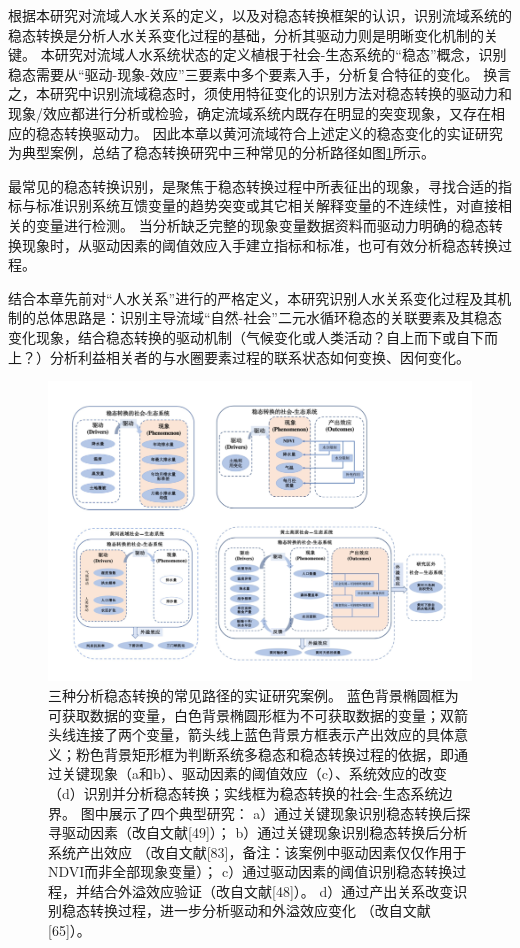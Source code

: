 根据本研究对流域人水关系的定义，以及对稳态转换框架的认识，识别流域系统的稳态转换是分析人水关系变化过程的基础，分析其驱动力则是明晰变化机制的关键。
本研究对流域人水系统状态的定义植根于社会-生态系统的“稳态”概念，识别稳态需要从“驱动-现象-效应”三要素中多个要素入手，分析复合特征的变化。
换言之，本研究中识别流域稳态时，须使用特征变化的识别方法对稳态转换的驱动力和现象/效应都进行分析或检验，确定流域系统内既存在明显的突变现象，又存在相应的稳态转换驱动力。
因此本章以黄河流域符合上述定义的稳态变化的实证研究为典型案例，总结了稳态转换研究中三种常见的分析路径如图\ref{ch2:fig:identifying}所示。

最常见的稳态转换识别，是聚焦于稳态转换过程中所表征出的现象，寻找合适的指标与标准识别系统互馈变量的趋势突变或其它相关解释变量的不连续性，对直接相关的变量进行检测。
当分析缺乏完整的现象变量数据资料而驱动力明确的稳态转换现象时，从驱动因素的阈值效应入手建立指标和标准，也可有效分析稳态转换过程。

结合本章先前对“人水关系”进行的严格定义，本研究识别人水关系变化过程及其机制的总体思路是：识别主导流域“自然-社会”二元水循环稳态的关联要素及其稳态变化现象，结合稳态转换的驱动机制（气候变化或人类活动？自上而下或自下而上？）分析利益相关者的与水圈要素过程的联系状态如何变换、因何变化。

\begin{figure}[!htb] %
    \includegraphics[width=\textwidth]{img/ch2/ch2_identifying.png}
    \caption[三种分析稳态转换的常见路径的实证研究案例]{三种分析稳态转换的常见路径的实证研究案例。
    蓝色背景椭圆框为可获取数据的变量，白色背景椭圆形框为不可获取数据的变量；双箭头线连接了两个变量，箭头线上蓝色背景方框表示产出效应的具体意义；粉色背景矩形框为判断系统多稳态和稳态转换过程的依据，即通过关键现象（a和b）、驱动因素的阈值效应（c）、系统效应的改变（d）识别并分析稳态转换；实线框为稳态转换的社会-生态系统边界。
    图中展示了四个典型研究：
    a）通过关键现象识别稳态转换后探寻驱动因素（改自文献[49]）；
    b）通过关键现象识别稳态转换后分析系统产出效应 （改自文献[83]，备注：该案例中驱动因素仅仅作用于NDVI而非全部现象变量）；
    c）通过驱动因素的阈值识别稳态转换过程，并结合外溢效应验证（改自文献[48]）。
    d）通过产出关系改变识别稳态转换过程，进一步分析驱动和外溢效应变化 （改自文献[65]）。}\label{ch2:fig:identifying}
\end{figure}
